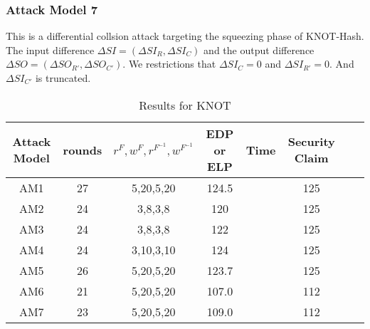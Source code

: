 \subsubsection{Attack Model 7}
This is a differential collsion attack targeting the squeezing phase of KNOT-Hash. The input difference $\Delta SI=(\Delta SI_R,\Delta SI_C)$ and the output difference $\Delta SO=(\Delta SO_{R'},\Delta SO_{C'})$. We restrictions that $\Delta SI_C=0$ and $\Delta SI_{R'}=0$. And $\Delta SI_{C'}$ is truncated. 

\begin{table}
	\caption{Results for KNOT}\label{tab:knot}
	\centering
	\begin{tabular}{|c|c|c|c|c|c|c|c|}
		\hline
		Attack Model & rounds & $r^F,w^F,r^{F^{-1}},w^{F^{-1}}$ & EDP or ELP & Time & Security Claim\\
		\hline
		AM1 & 27 & 5,20,5,20 & 124.5 & & 125 \\
		AM2 & 24 & 3,8,3,8 & 120 & & 125 \\
		AM3 & 24 & 3,8,3,8 & 122 & & 125 \\
		AM4 & 24 & 3,10,3,10 & 124 & & 125 \\
		AM5 & 26 & 5,20,5,20 & 123.7 & & 125 \\
		AM6 & 21 & 5,20,5,20 & 107.0 & & 112 \\
		AM7 & 23 & 5,20,5,20 & 109.0 & & 112 \\
		\hline
	\end{tabular}
\end{table}